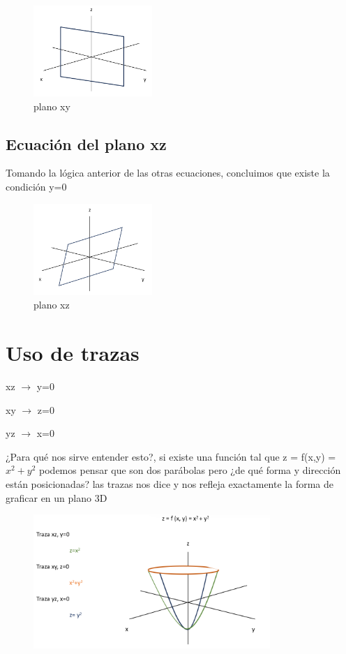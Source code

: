 \documentclass[letterpaper,12pt]{article}
\begin{document}
\begin{sloppypar}
\begin{figure}[H]
    \centering
    \includegraphics[width=0.4\textwidth]{images/plano yz.png}
    \caption{plano xy}
\end{figure}

\subsection{\textbf{Ecuación del plano xz}}
Tomando la lógica anterior de las otras ecuaciones, concluimos que existe la condición y=0
\begin{figure}[H]
    \centering
    \includegraphics[width=0.4\textwidth]{images/plano xz.png}
    \caption{plano xz}
\end{figure}

\section{Uso de trazas}
\begin{center}
    xz $\longrightarrow$  y=0

    xy $\longrightarrow$ z=0

    yz $\longrightarrow$ x=0
\end{center}

¿Para qué nos sirve entender esto?, si existe una función tal que z = f(x,y) = $x^2 + y^2$ podemos pensar que son dos parábolas pero ¿de qué forma y dirección están posicionadas? las trazas nos dice y nos refleja exactamente la forma de graficar en un plano 3D 

\begin{figure}
    \centering
    \includegraphics[width=0.8\textwidth]{images/usotraza.png}
\end{figure}


\end{sloppypar}
\end{document}
